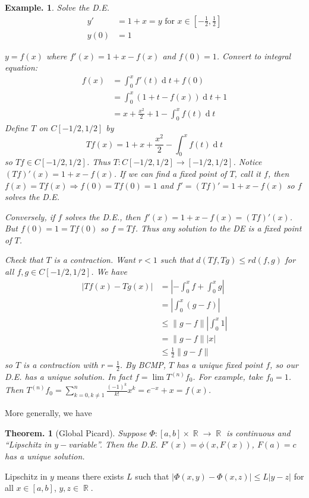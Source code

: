 \documentclass[11pt, a4paper]{memoir}
\DeclareMathOperator{\R}{{\mathbb{R}}}
\newcommand{\norm}[1]{\ensuremath{\left\lVert#1\right\rVert}}
\theoremstyle{change}
\newtheorem{theorem}{Theorem.}[section]
\theoremstyle{plain}
\theoremstyle{nonumberplain}
\newtheorem{example}{Example.}
\renewcommand{\d}[1]{\ensuremath{\operatorname{d}\!{#1}}}
\numberwithin{equation}{section}
\begin{document}
\begin{example}
    Solve the D.E.
    \begin{align*}
        y' &= 1+x=y\text{ for } x\in\left[-\frac{1}{2},\frac{1}{2}\right]\\
        y(0) &= 1
    \end{align*}

    $y=f(x)$ where $f'(x)=1+x-f(x)$ and $f(0)=1$.
    Convert to integral equation:
    \begin{align*}
        f(x) &= \int_0^x f'(t)\d{t}+f(0)\\
             &= \int_0^x(1+t-f(x))\d{t}+1\\
             &= x+\frac{x^2}{2}+1-\int_0^x f(t)\d{t}
    \end{align*}
    Define $T$ on $C[-1/2,1/2]$ by
    \[Tf(x)=1+x+\frac{x^2}{2}-\int_0^x f(t)\d{t}\]
    so $Tf\in C[-1/2,1/2]$.
    Thus $T:C[-1/2,1/2]\to[-1/2,1/2]$.
    Notice $(Tf)'(x)=1+x-f(x)$.
    If we can find a fixed point of $T$, call it $f$, then $f(x)=Tf(x)\Rightarrow f(0)=Tf(0)=1$ and $f'=(Tf)'=1+x-f(x)$ so $f$ solves the D.E.

    Conversely, if $f$ solves the D.E., then $f'(x)=1+x-f(x)=(Tf)'(x)$.
    But $f(0)=1=Tf(0)$ so $f=Tf$.
    Thus any solution to the DE is a fixed point of $T$.

    Check that $T$ is a contraction.
    Want $r<1$ such that $d(Tf,Tg)\leq rd(f,g)$ for all $f,g\in C[-1/2,1/2]$.
    We have
    \begin{align*}
        |Tf(x)-Tg(x)| &= \left\lvert-\int_0^x f+\int_0^x g\right\rvert\\
                      &= \left\lvert\int_0^x(g-f)\right\rvert\\
                      &\leq \norm{g-f}\left\lvert\int_0^x 1\right\rvert\\
                      &= \norm{g-f}|x|\\
                      &\leq\frac{1}{2}\norm{g-f}
    \end{align*}
    so $T$ is a contraction with $r=\frac{1}{2}$.
    By BCMP, $T$ has a unique fixed point $f$, so our D.E. has a unique solution.
    In fact $f=\lim T^{(n)} f_0$.
    For example, take $f_0=1$.
    Then $T^{(n)}f_0=\sum\limits_{k=0,k\neq 1}^n\frac{(-1)^k}{k!}x^k=e^{-x}+x=f(x)$.
\end{example}
More generally, we have
\begin{theorem}[Global Picard]
    Suppose $\Phi:[a,b]\times\R\to\R$ is continuous and ``Lipschitz in $y-$variable''.
    Then the D.E. $F'(x)=\phi(x,F(x))$, $F(a)=c$ has a unique solution.
\end{theorem}
Lipschitz in $y$ means there exists $L$ such that $\left\lvert\Phi(x,y)-\Phi(x,z)\right\rvert\leq L|y-z|$ for all $x\in[a,b]$, $y,z\in\R$.
\end{document}

